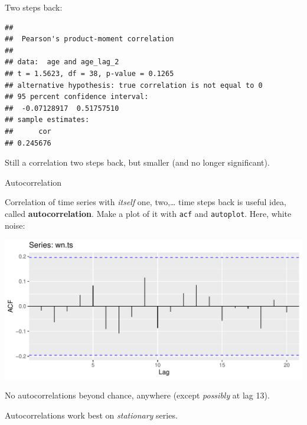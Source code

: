 \documentclass[ignorenonframetext,]{beamer}
\newenvironment{Shaded}{\begin{snugshade}}{\end{snugshade}}
\newcommand{\DataTypeTok}[1]{\textcolor[rgb]{0.13,0.29,0.53}{#1}}
\newcommand{\DecValTok}[1]{\textcolor[rgb]{0.00,0.00,0.81}{#1}}
\newcommand{\KeywordTok}[1]{\textcolor[rgb]{0.13,0.29,0.53}{\textbf{#1}}}
\newcommand{\NormalTok}[1]{#1}
\newcommand{\OperatorTok}[1]{\textcolor[rgb]{0.81,0.36,0.00}{\textbf{#1}}}
\newcommand{\StringTok}[1]{\textcolor[rgb]{0.31,0.60,0.02}{#1}}
\begin{document}
\begin{frame}[fragile]{Two steps back:}
\protect\hypertarget{two-steps-back}{}

\small

\begin{Shaded}
\end{Shaded}

\begin{verbatim}
## 
##  Pearson's product-moment correlation
## 
## data:  age and age_lag_2
## t = 1.5623, df = 38, p-value = 0.1265
## alternative hypothesis: true correlation is not equal to 0
## 95 percent confidence interval:
##  -0.07128917  0.51757510
## sample estimates:
##      cor 
## 0.245676
\end{verbatim}

\normalsize

Still a correlation two steps back, but smaller (and no longer
significant).

\end{frame}

\begin{frame}[fragile]{Autocorrelation}
\protect\hypertarget{autocorrelation}{}

Correlation of time series with \emph{itself} one, two,\ldots{} time
steps back is useful idea, called \textbf{autocorrelation}. Make a plot
of it with \texttt{acf} and \texttt{autoplot}. Here, white noise:

\begin{Shaded}
\end{Shaded}

\includegraphics{figure/unnamed-chunk-534-1.pdf}

No autocorrelations beyond chance, anywhere (except \emph{possibly} at
lag 13).

Autocorrelations work best on \emph{stationary} series.

\end{frame}
\end{document}
